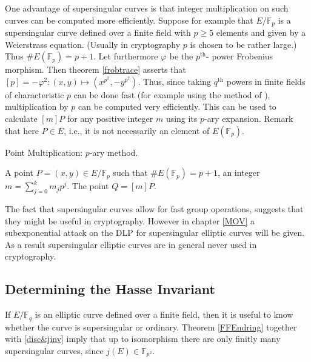 \documentclass{article}
\numberwithin{equation}{section}
\theoremstyle{definition}
\newcommand{\FF}[1]{{\mathbb F}_{#1}} %
\newcommand{\frob}[1][]{\varphi_{#1}} %
\begin{document}
One advantage of supersingular curves is that integer multiplication on such curves can be computed more efficiently. Suppose for example that $E/\FF{p}$ is a supersingular curve defined over a finite field with $p \geq 5$ elements and given by a Weierstrass equation. (Usually in cryptography $p$ is chosen to be rather large.) Thus $\#E(\FF{p}) = p+1$. Let furthermore $\frob$ be the $p^\text{th}$- power Frobenius morphism. Then theorem \ref{frobtrace} asserts that $[p]=-\frob^2: (x,y) \mapsto (x^{p^2},-y^{p^2})$. Thus, since taking $q^\text{th}$ powers in finite fields of characteristic $p$ can be done fast (for example using the method of \cite[App.C]{Washington}), multiplication by $p$ can be computed very efficiently. This can be used to calculate $[m]P$ for any positive integer $m$ using its $p$-ary expansion. Remark that here $P\in E$, i.e., it is not necessarily an element of $E(\FF{p})$. 

\begin{algorithm}
\caption{Point Multiplication: $p$-ary method.}
\begin{algorithmic}[1]
  \normalsize
  \REQUIRE A point $P=(x,y) \in E/\FF{p}$ such that $\#E(\FF{p})=p+1$, an integer $m=\sum_{j=0}^{k} m_j p^j$.
  \ENSURE The point $Q=[m]P$.
  \ENDFOR
  \ENDFOR 
\end{algorithmic}
\end{algorithm}

The fact that supersingular curves allow for fast group operations, suggests that they might be useful in cryptography. However in chapter \ref{MOV} a subexponential attack on the DLP for supersingular elliptic curves will be given. As a result supersingular elliptic curves are in general never used in cryptography.




\subsection{Determining the Hasse Invariant}
If $E/\FF{q}$ is an elliptic curve defined over a finite field, then it is useful to know whether the curve is supersingular or ordinary. Theorem \ref{FFEndring} together with \ref{disc&jinv} imply that up to isomorphism there are only finitly many supersingular curves, since $j(E) \in \FF{p^2}$. 
\end{document}
